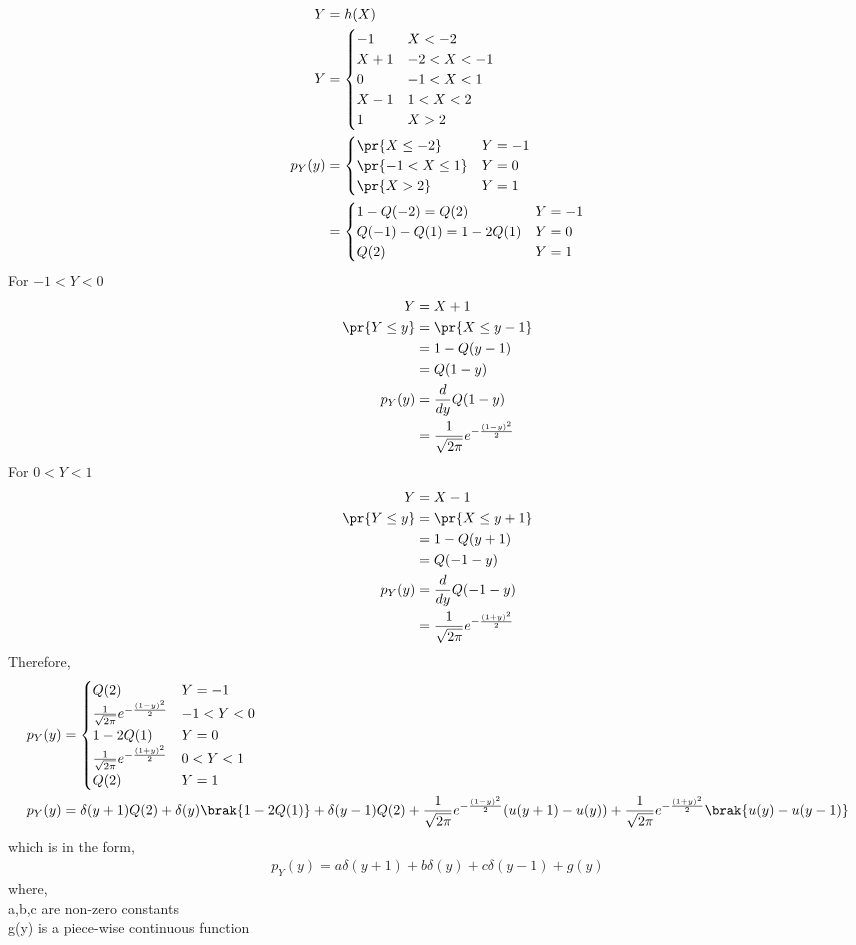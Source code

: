 \documentclass[book,11pt]{IEEEtran}
\begin{document}
\solution
\begin{align}
Y&=h(X)\\
Y&=
\begin{cases}
-1 & X<-2\\
X+1 & -2<X<-1\\
0 & -1<X<1\\
X-1 & 1<X<2\\
1 & X>2
\end{cases}\\
p_Y(y)&=
\begin{cases}
\pr{X\leq -2} & Y=-1\\
\pr{-1<X\leq 1} & Y=0\\
\pr{X>2} & Y=1
\end{cases}\\
&=
\begin{cases}
1-Q(-2)=Q(2) & Y=-1\\
Q(-1)-Q(1)=1-2Q(1) & Y=0\\
Q(2) & Y=1
\end{cases}
\end{align}
For $-1<Y<0$
\begin{align}
Y&=X+1\\
\pr{Y\leq y}&=\pr{X\leq y-1}\\
&=1-Q(y-1)\\
&=Q(1-y)\\
p_Y(y)&=\frac{d}{dy}Q(1-y)\\
&=\frac{1}{\sqrt{2\pi}}e^{-\frac{(1-y)^2}{2}}
\end{align}
For $0<Y<1$
\begin{align}
Y&=X-1\\
\pr{Y\leq y}&=\pr{X\leq y+1}\\
&=1-Q(y+1)\\
&=Q(-1-y)\\
p_Y(y)&=\frac{d}{dy}Q(-1-y)\\
&=\frac{1}{\sqrt{2\pi}}e^{-\frac{(1+y)^2}{2}}
\end{align}
Therefore,
\begin{align}
p_Y(y)&=
\begin{cases}
Q(2) & Y=-1\\
\frac{1}{\sqrt{2\pi}}e^{-\frac{(1-y)^2}{2}} & -1<Y<0\\
1-2Q(1) & Y=0\\
\frac{1}{\sqrt{2\pi}}e^{-\frac{(1+y)^2}{2}} & 0<Y<1\\
Q(2) & Y=1
\end{cases}\\
p_Y(y)&=\delta(y+1)Q(2)+\delta(y)\brak{1-2Q(1)}+\delta(y-1)Q(2)+\frac{1}{\sqrt{2\pi}}e^{-\frac{(1-y)^2}{2}}(u(y+1)-u(y))+\frac{1}{\sqrt{2\pi}}e^{-\frac{(1+y)^2}{2}}\brak{u(y)-u(y-1)}
\end{align}
which is in the form,
\begin{align}
p_Y(y)=a\delta (y+1) + b\delta (y) + c\delta (y-1) + g(y)
\end{align}
where,\\
a,b,c are non-zero constants\\
g(y) is a piece-wise continuous function
\end{document}
